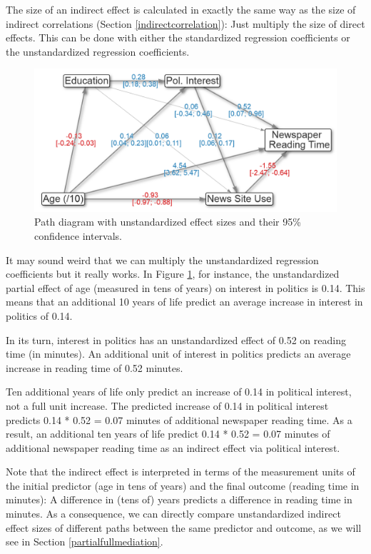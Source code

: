 \documentclass[a4paper]{book}
\theoremstyle{definition}
\theoremstyle{definition}
\theoremstyle{definition}
\theoremstyle{remark}
\begin{document}
The size of an indirect effect is calculated in exactly the same way as
the size of indirect correlations (Section \ref{indirectcorrelation}):
Just multiply the size of direct effects. This can be done with either
the standardized regression coefficients or the unstandardized
regression coefficients.

\begin{figure}[H]
\centering
\includegraphics{figures/pathdiagram-unstandardized.png}
\caption{\label{fig:pathdiagram-unstandardized}Path diagram with
unstandardized effect sizes and their 95\% confidence intervals.}
\end{figure}

It may sound weird that we can multiply the unstandardized regression
coefficients but it really works. In Figure
\ref{fig:pathdiagram-unstandardized}, for instance, the unstandardized
partial effect of age (measured in tens of years) on interest in
politics is 0.14. This means that an additional 10 years of life predict
an average increase in interest in politics of 0.14.

In its turn, interest in politics has an unstandardized effect of 0.52
on reading time (in minutes). An additional unit of interest in politics
predicts an average increase in reading time of 0.52 minutes.

Ten additional years of life only predict an increase of 0.14 in
political interest, not a full unit increase. The predicted increase of
0.14 in political interest predicts 0.14 * 0.52 = 0.07 minutes of
additional newspaper reading time. As a result, an additional ten years
of life predict 0.14 * 0.52 = 0.07 minutes of additional newspaper
reading time as an indirect effect via political interest.

Note that the indirect effect is interpreted in terms of the measurement
units of the initial predictor (age in tens of years) and the final
outcome (reading time in minutes): A difference in (tens of) years
predicts a difference in reading time in minutes. As a consequence, we
can directly compare unstandardized indirect effect sizes of different
paths between the same predictor and outcome, as we will see in Section
\ref{partialfullmediation}.
\end{document}
